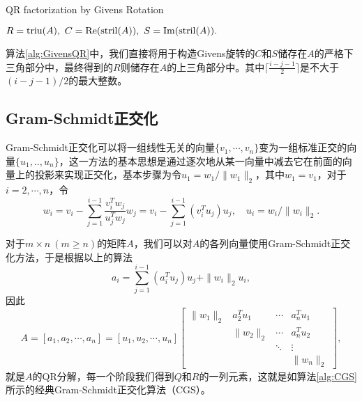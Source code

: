 \documentclass[a4paper,10pt]{ctexart}
\begin{document}
\begin{algorithm}[htbp]
    \caption{QR factorization by Givens Rotation}\label{alg:GivensQR}
    \Return $ R = {\rm triu}(A),\ C = {\rm Re}({\rm stril}(A)),\ S = {\rm Im}({\rm stril}(A)) .$\;
\end{algorithm}

算法\ref{alg:GivensQR}中，我们直接将用于构造Givens旋转的$ C $和$ S $储存在$ A $的严格下三角部分中，最终得到的$ R $则储存在$ A $的上三角部分中。其中$ \lceil \frac{i-j-1}{2} \rceil $是不大于$ (i-j-1)/2 $的最大整数。

\subsection{Gram-Schmidt正交化}
Gram-Schmidt正交化可以将一组线性无关的向量$ \{v_1,\cdots ,v_n\} $变为一组标准正交的向量$ \{u_1,..,u_n\} $，这一方法的基本思想是通过逐次地从某一向量中减去它在前面的向量上的投影来实现正交化，基本步骤为令$ u_1 = w_1 / \| w_1  \|_2 $，其中$ w_1=v_1 $，对于$ i = 2,\cdots ,n $，令
\[
    w_i = v_i - \sum_{j=1}^{i-1} \frac{v_i^T w_j}{u_j^T w_j}w_j = v_i - \sum_{j=1}^{i-1} (v_i^T u_j)u_j ,\quad u_i = w_i / \| w_i \|_2.
\]

对于$ m\times n\ (m\geqslant n) $的矩阵$ A $，我们可以对$ A $的各列向量使用Gram-Schmidt正交化方法，于是根据以上的算法
\[
    a_i = \sum_{j=1}^{i-1}(a_i^T u_j)u_j + \| w_i \|_2 u_i,
\]
因此
\[
    A = [a_1, a_2, \cdots , a_n] = [u_1, u_2, \cdots , u_n] 
    \begin{bmatrix}
        \| w_1 \|_2 & a_2^T u_1 & \cdots & a_n^T u_1\\
        & \| w_2 \|_2 & \cdots & a_n^T u_2\\
        & & \ddots & \vdots\\
        & & &\| w_n \|_2
    \end{bmatrix},
\]
就是$ A $的QR分解，每一个阶段我们得到$ Q $和$ R $的一列元素，这就是如算法\ref{alg:CGS}所示的经典Gram-Schmidt正交化算法（CGS）。
\end{document}
